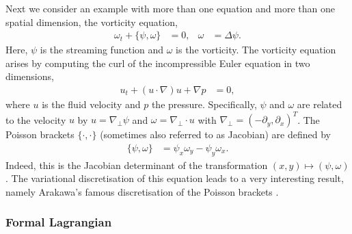 \documentclass[12pt,a4paper,reqno]{article}
\begin{document}
Next we consider an example with more than one equation and more than one spatial dimension, the vorticity equation,
\begin{align}\label{eq:vorticity_equations}
\omega_{\ensuremath{{\ensuremath{{t}}}}} + \{ \psi , \omega \} &= 0 , &
\omega &= \Delta \psi .
\end{align}
Here, $\psi$ is the streaming function and $\omega$ is the vorticity.
The vorticity equation arises by computing the curl of the incompressible Euler equation in two dimensions,
\begin{align}\label{eq:navier_stokes_equation}
u_{\ensuremath{{\ensuremath{{t}}}}} + ( u \cdot \nabla ) u + \nabla p &= 0 ,
\end{align}
where $u$ is the fluid velocity and $p$ the pressure.
Specifically, $\psi$ and $\omega$ are related to the velocity $u$ by $u = \nabla_{\perp} \psi$ and $\omega = \nabla_{\perp} \cdot u$ with $\nabla_{\perp} = ( - \partial_{y}, \partial_{x})^{T}$.
The Poisson brackets $\{ \cdot , \cdot \}$ (sometimes also referred to as Jacobian) are defined by
\begin{align}\label{eq:vorticity_brackets}
\{ \psi , \omega \} &= \psi_{\ensuremath{{\ensuremath{{x}}}}} \omega_{\ensuremath{{\ensuremath{{y}}}}} - \psi_{\ensuremath{{\ensuremath{{y}}}}} \omega_{\ensuremath{{\ensuremath{{x}}}}} .
\end{align}
Indeed, this is the Jacobian determinant of the transformation $({\ensuremath{{\ensuremath{{x}}}}}, {\ensuremath{{\ensuremath{{y}}}}}) \mapsto (\psi , \omega)$.
The variational discretisation of this equation leads to a very interesting result, namely Arakawa's famous discretisation of the Poisson brackets \cite{Arakawa:1966}.

\subsubsection{Formal Lagrangian}
\end{document}
